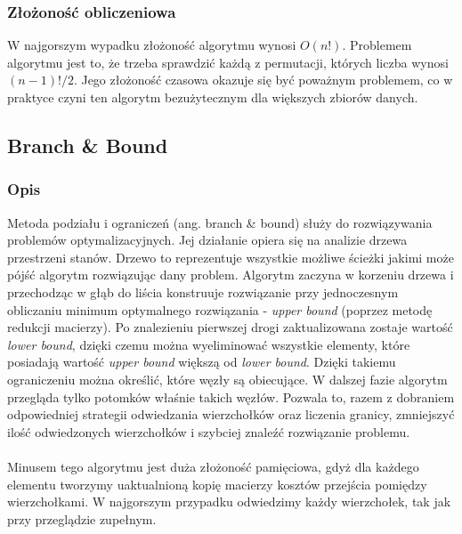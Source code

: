 \documentclass[12pt,a4paper,titlepage]{article}
\begin{document}
\subsubsection{Złożoność obliczeniowa}
W najgorszym wypadku złożoność algorytmu wynosi $O(n!)$. Problemem algorytmu jest to, że trzeba sprawdzić każdą z permutacji, których liczba wynosi $(n-1)!/2$. Jego złożoność czasowa okazuje się być poważnym problemem, co w praktyce czyni ten algorytm bezużytecznym dla większych zbiorów danych.

\subsection{Branch \& Bound}
\subsubsection{Opis}
Metoda podziału i ograniczeń (ang. branch \& bound) służy do rozwiązywania problemów optymalizacyjnych. Jej działanie opiera się na analizie drzewa przestrzeni stanów. Drzewo to reprezentuje wszystkie możliwe ścieżki jakimi może pójść algorytm rozwiązując dany problem. Algorytm zaczyna w korzeniu drzewa i przechodząc w głąb do liścia konstruuje rozwiązanie przy jednoczesnym obliczaniu minimum optymalnego rozwiązania - \textit{upper bound} (poprzez metodę redukcji macierzy). Po znalezieniu pierwszej drogi zaktualizowana zostaje wartość \textit{lower bound}, dzięki czemu można wyeliminować wszystkie elementy, które posiadają wartość \textit{upper bound} większą od \textit{lower bound}. Dzięki takiemu ograniczeniu można określić, które węzły są obiecujące. W dalszej fazie algorytm przegląda tylko potomków właśnie takich węzłów. Pozwala to, razem z dobraniem odpowiedniej strategii odwiedzania wierzchołków oraz liczenia granicy, zmniejszyć ilość odwiedzonych wierzchołków i szybciej znaleźć rozwiązanie problemu.
\\\\
Minusem tego algorytmu jest duża złożoność pamięciowa, gdyż dla każdego elementu tworzymy uaktualnioną kopię macierzy kosztów przejścia pomiędzy wierzchołkami. W najgorszym przypadku odwiedzimy każdy wierzchołek, tak jak przy przeglądzie zupełnym.
\end{document}
